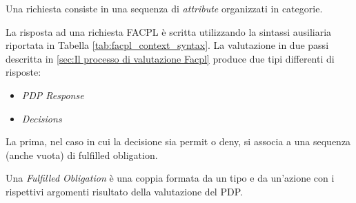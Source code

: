 Una richiesta consiste in una sequenza di \emph{attribute} organizzati in categorie.\par
La risposta ad una richiesta \ac{FACPL} è scritta utilizzando la sintassi ausiliaria riportata in Tabella \ref{tab:facpl_context_syntax}.
La valutazione in due passi descritta in \ref{sec:Il processo di valutazione Facpl} produce due tipi differenti di risposte:
\begin{itemize}
  \renewcommand\labelitemi{--}
  \item \emph{\ac{PDP} Response}
  \item \emph{Decisions}
\end{itemize}
La prima, nel caso in cui la decisione sia permit o deny, si associa a una sequenza (anche vuota) di fulfilled obligation.\par
Una \emph{Fulfilled Obligation} è una coppia formata da un tipo e da un'azione con i rispettivi argomenti risultato della
valutazione del \ac{PDP}.


